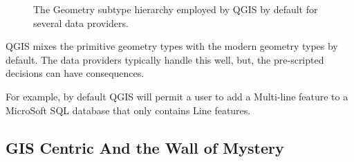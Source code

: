 \documentclass[letterpaper,11pt,english]{sphinxmanual}
\begin{document}
%
\begin{sphinxVerbatim}[commandchars=\\\{\}]
   
  
  
  
\PYG{p}{[}\PYG{p}{]}
\end{sphinxVerbatim}

\begin{figure}[htbp]
\centering
\capstart

\noindent{}
\caption{The Geometry subtype hierarchy employed by QGIS by default for several data providers.}\label{\detokenize{concept:id62}}\label{\detokenize{concept:figuregeomtypeii}}\end{figure}

QGIS mixes the primitive geometry types with the modern geometry types by default.  The data providers typically handle this well, but, the pre-scripted decisions can have consequences.

For example, by default QGIS will permit a user to add a Multi-line feature to a MicroSoft SQL database that only contains Line features.


\subsection{GIS Centric And the Wall of Mystery}
\label{\detokenize{concept:gis-centric-and-the-wall-of-mystery}}
\end{document}
